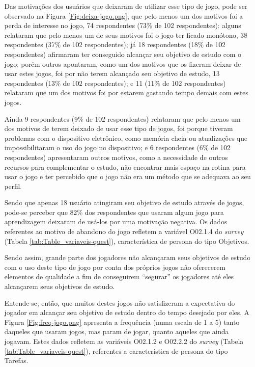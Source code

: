 Das motivações dos usuários que deixaram de utilizar esse tipo de jogo, pode ser observado na Figura \ref{Fig:deixa-jogo.png}, que pelo menos um dos motivos foi a perda de interesse no jogo, 74 respondentes (73\% de 102 respondentes); alguns relataram que pelo menos um de seus motivos foi o jogo ter ficado monótono, 38 respondentes (37\% de 102 respondentes); já 18 respondentes (18\% de 102 respondentes) afirmaram ter conseguido alcançar seu objetivo de estudo com o jogo; porém outros apontaram, como um dos motivos que os fizeram deixar de usar estes jogos, foi por não terem alcançado seu objetivo de estudo, 13 respondentes (13\% de 102 respondentes); e 11 (11\% de 102 respondentes) relataram que um dos motivos foi por estarem gastando tempo demais com estes jogos.

Ainda 9 respondentes (9\% de 102 respondentes) relataram que pelo menos um dos motivos de terem deixado de usar esse tipo de jogos, foi porque tiveram problemas com o dispositivo eletrônico, como memória cheia ou atualizações que impossibilitaram o uso do jogo no dispositivo; e 6 respondentes (6\% de 102 respondentes) apresentaram outros motivos, como a necessidade de outros recursos para complementar o estudo, não encontrar mais espaço na rotina para usar o jogo e ter percebido que o jogo não era um método que se adequava ao seu perfil.

Sendo que apenas 18 usuário atingiram seu objetivo de estudo através de jogos, pode-se perceber que 82\% dos respondentes que usaram algum jogo para aprendizagem deixaram de usá-los por uma motivação negativa. Os dados referentes ao motivo de abandono do jogo refletem a variável O02.1.4 do \textit{survey} (Tabela \ref{tab:Table_variaveis-quest}), característica de persona do tipo Objetivos.

Sendo assim, grande parte dos jogadores não alcançaram seus objetivos de estudo com o uso deste tipo de jogo por conta dos próprios jogos não oferecerem elementos de qualidade a fim de conseguirem ``segurar'' os jogadores até eles alcançarem seus objetivos de estudo. 


Entende-se, então, que muitos destes jogos não satisfizeram a expectativa do jogador em alcançar seu objetivo de estudo dentro do tempo desejado por eles. A Figura \ref{Fig:freq-jogo.png} apresenta a frequência (numa escala de 1 a 5) tanto daqueles que usaram jogos, mas param de jogar, quanto aqueles que ainda jogavam. Estes dados refletem as variáveis O02.1.2 e O02.2.2 do \textit{survey} (Tabela \ref{tab:Table_variaveis-quest}), referentes a característica de persona do tipo Tarefas.

